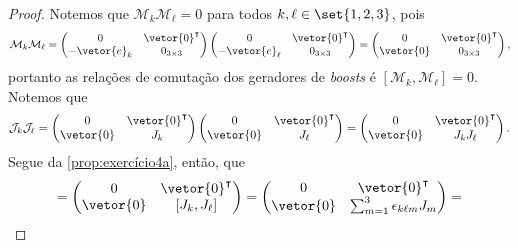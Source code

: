 \begin{proof}
    Notemos que \(\mathcal{M}_k \mathcal{M}_\ell = 0\) para todos \(k,\ell \in \set{1,2,3}\), pois
    \begin{equation*}
        \mathcal{M}_k\mathcal{M}_\ell =
        \begin{pmatrix}
            0 & \vetor{0}^\intercal\\
            -\vetor{e}_k & 0_{3\times3}
        \end{pmatrix}
        \begin{pmatrix}
            0 & \vetor{0}^\intercal\\
            -\vetor{e}_\ell & 0_{3\times3}
        \end{pmatrix} =
        \begin{pmatrix}
            0 & \vetor{0}^\intercal\\
            \vetor{0} & 0_{3\times3}
        \end{pmatrix},
    \end{equation*}
    portanto as relações de comutação dos geradores de \emph{boosts} é \([\mathcal{M}_k,\mathcal{M}_\ell] = 0.\)
    Notemos que
    \begin{equation*}
        \mathcal{J}_k\mathcal{J}_\ell =
        \begin{pmatrix}
            0 & \vetor{0}^\intercal\\
            \vetor{0} & J_k
        \end{pmatrix}
        \begin{pmatrix}
            0 & \vetor{0}^\intercal\\
            \vetor{0} & J_\ell
        \end{pmatrix} =
        \begin{pmatrix}
            0 & \vetor{0}^\intercal\\
            \vetor{0} & J_kJ_\ell
        \end{pmatrix}.
    \end{equation*}
    Segue da \cref{prop:exercício4a}, então, que
    \begin{equation*}
        [\mathcal{J}_k,\mathcal{J}_\ell] = \begin{pmatrix}
            0 & \vetor{0}^\intercal\\
            \vetor{0} & [J_k,J_\ell]
        \end{pmatrix}
        = \begin{pmatrix}
            0 & \vetor{0}^\intercal\\
            \vetor{0} & \sum_{m = 1}^3 \epsilon_{k \ell m} J_m
        \end{pmatrix} =

\end{equation*}
\end{proof}
